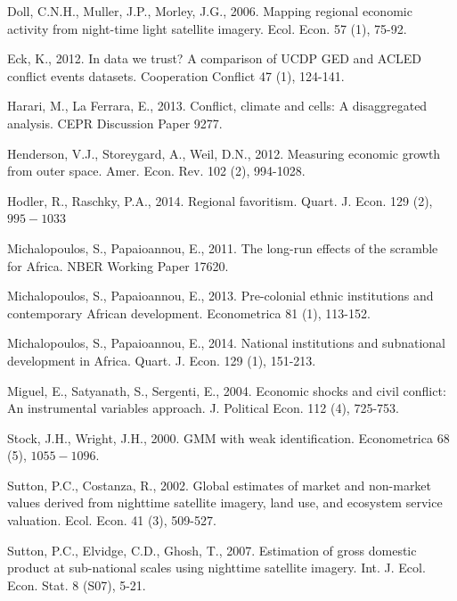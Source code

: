 \documentclass[10pt]{article}
\begin{document}
Doll, C.N.H., Muller, J.P., Morley, J.G., 2006. Mapping regional economic activity from night-time light satellite imagery. Ecol. Econ. 57 (1), 75-92.

Eck, K., 2012. In data we trust? A comparison of UCDP GED and ACLED conflict events datasets. Cooperation Conflict 47 (1), 124-141.

Harari, M., La Ferrara, E., 2013. Conflict, climate and cells: A disaggregated analysis. CEPR Discussion Paper 9277.

Henderson, V.J., Storeygard, A., Weil, D.N., 2012. Measuring economic growth from outer space. Amer. Econ. Rev. 102 (2), 994-1028.

Hodler, R., Raschky, P.A., 2014. Regional favoritism. Quart. J. Econ. 129 (2), $995-1033$

Michalopoulos, S., Papaioannou, E., 2011. The long-run effects of the scramble for Africa. NBER Working Paper 17620.

Michalopoulos, S., Papaioannou, E., 2013. Pre-colonial ethnic institutions and contemporary African development. Econometrica 81 (1), 113-152.

Michalopoulos, S., Papaioannou, E., 2014. National institutions and subnational development in Africa. Quart. J. Econ. 129 (1), 151-213.

Miguel, E., Satyanath, S., Sergenti, E., 2004. Economic shocks and civil conflict: An instrumental variables approach. J. Political Econ. 112 (4), 725-753.

Stock, J.H., Wright, J.H., 2000. GMM with weak identification. Econometrica 68 (5), $1055-1096$.

Sutton, P.C., Costanza, R., 2002. Global estimates of market and non-market values derived from nighttime satellite imagery, land use, and ecosystem service valuation. Ecol. Econ. 41 (3), 509-527.

Sutton, P.C., Elvidge, C.D., Ghosh, T., 2007. Estimation of gross domestic product at sub-national scales using nighttime satellite imagery. Int. J. Ecol. Econ. Stat. 8 (S07), 5-21.
\end{document}
